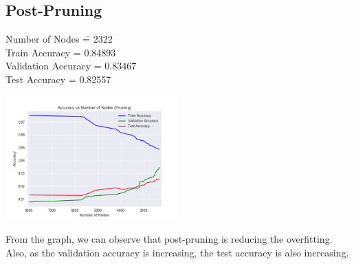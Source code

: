 \documentclass[12pt]{article}
\begin{document}
\subsection*{Post-Pruning}
\begin{addmargin}[0.3in]{0in}
\begin{tabbing}
Number of Nodes \qquad \= = 2322 \\
Train Accuracy \> = 0.84893 \\
Validation Accuracy \> = 0.83467 \\
Test Accuracy  \> = 0.82557 \\
\end{tabbing}
\end{addmargin}
\includegraphics[width=0.5\textwidth]{dtree3.png}
\vspace{1mm}
\begin{addmargin}[0.3in]{0in}
From the graph, we can observe that post-pruning is reducing the overfitting. Also, as the validation accuracy is increasing, the test accuracy is also increasing.
\end{addmargin}
\end{document}
